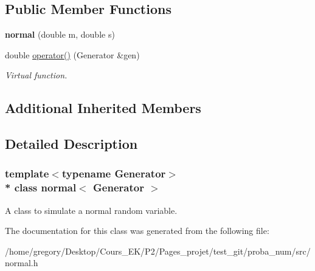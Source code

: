 \subsection*{Public Member Functions}
\begin{DoxyCompactItemize}
\item 
{\bfseries normal} (double m, double s)\hypertarget{classnormal_af8582789d606124cf4cfdf981c7b5943}{}\label{classnormal_af8582789d606124cf4cfdf981c7b5943}

\item 
double \hyperlink{classnormal_a56c48e011ff2fbce46aea55f1efbbbc1}{operator()} (Generator \&gen)\hypertarget{classnormal_a56c48e011ff2fbce46aea55f1efbbbc1}{}\label{classnormal_a56c48e011ff2fbce46aea55f1efbbbc1}

\begin{DoxyCompactList}\small\item\em Virtual function. \end{DoxyCompactList}\end{DoxyCompactItemize}
\subsection*{Additional Inherited Members}


\subsection{Detailed Description}
\subsubsection*{template$<$typename Generator$>$\\*
class normal$<$ Generator $>$}

A class to simulate a normal random variable. 

The documentation for this class was generated from the following file\+:\begin{DoxyCompactItemize}
\item 
/home/gregory/\+Desktop/\+Cours\+\_\+\+E\+K/\+P2/\+Pages\+\_\+projet/test\+\_\+git/proba\+\_\+num/src/normal.\+h\end{DoxyCompactItemize}
